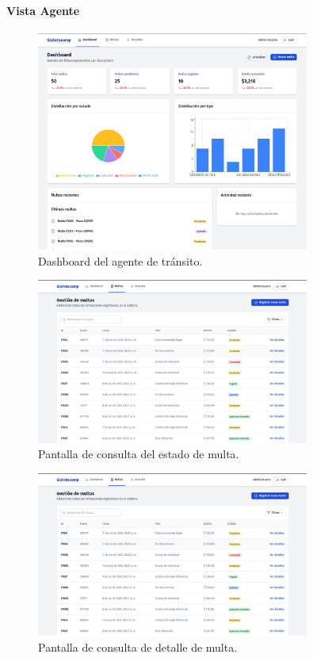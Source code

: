\paragraph{Vista Agente}
\begin{figure}[htbp]
    \centering
    \includegraphics[width=0.8\textwidth]{Images/UI3.png}
    \caption{Dashboard del agente de tránsito.}
    \label{fig:dashboard_agente}
\end{figure}
\begin{figure}[htbp]
    \centering
    \includegraphics[width=0.8\textwidth]{Images/UI4.png}
    \caption{Pantalla de consulta del estado de multa.}
    \label{fig:consulta_estado_multa}
\end{figure}
\begin{figure}[htbp]
    \centering
    \includegraphics[width=0.8\textwidth]{Images/UI4.png}
    \caption{Pantalla de consulta de detalle de multa.}
    \label{fig:consulta_detalle_multa}
\end{figure}

